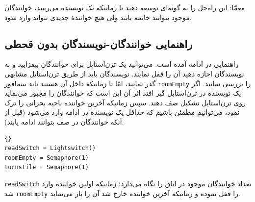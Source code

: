 \documentclass{book}
\newcommand{\clearemptydoublepage}{\newpage\cleardoublepage}
\begin{document}
    معمّا: این راه‌حل را به گونه‌ای توسعه دهید تا زمانیکه یک نویسنده می‌رسد، خوانندگان موجود بتوانند خاتمه یابند ولی هیچ خوانندهٔ جدیدی نتواند وارد شود. 


\clearemptydoublepage
\subsection {راهنمایی خوانندگان-نویسندگان بدون قحطی}  

    راهنمایی در ادامه آمده است. می‌توانید یک ترن‌استایل برای خوانندگان بیفزایید و به نویسندگان اجازه دهید آن را قفل نمایند. 
    نویسندگان باید از طریق ترن‌استایل مشابهی گذر نمایند، امّا تا زمانیکه داخل آن هستند باید سمافور {\tt roomEmpty} را بررسی نمایند. 
    اگر یک نویسنده در ترن‌استایل گیر افتد اثر آن این است که خوانندگان را مجبور می‌نماید روی ترن‌استایل تشکیل صف دهند. سپس زمانیکه آخرین 
    خواننده ناحیه بحرانی را ترک نمود، می‌توانیم مطمئن باشیم که حداقل یک نویسنده در ادامه وارد می‌شود (قبل از آنکه خوانندگان در صف بتوانند ادامه یابند).

\begin{latin}
\begin{lstlisting}[title=\rl{مقدار دهی اولیه خوانندگان-نویسندگان بدون قحطی}]{}
readSwitch = Lightswitch()
roomEmpty = Semaphore(1)
turnstile = Semaphore(1)
\end{lstlisting}
\end{latin}

    {\tt readSwitch} 
    تعداد خوانندگان موجود در اتاق را نگاه می‌دارد؛ زمانیکه اولین خواننده وارد شد  {\tt roomEmpty} را قفل نموده و زمانیکه آخرین خواننده خارج شد 
    آن را باز می‌نماید. 
\end{document}
